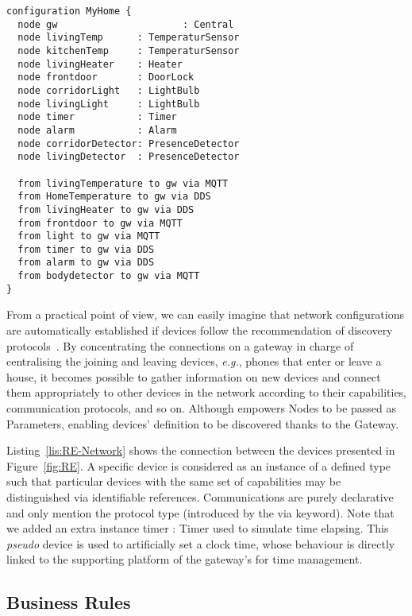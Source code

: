 \begin{lstlisting}[label=lis:RE-Network,language=iotdsl,caption=Network Configuration for Alice's House]	
configuration MyHome {
  node gw 					   : Central
  node livingTemp      : TemperaturSensor
  node kitchenTemp     : TemperaturSensor
  node livingHeater    : Heater
  node frontdoor       : DoorLock
  node corridorLight   : LightBulb
  node livingLight     : LightBulb
  node timer           : Timer
  node alarm           : Alarm
  node corridorDetector: PresenceDetector
  node livingDetector  : PresenceDetector

  from livingTemperature to gw via MQTT
  from HomeTemperature to gw via DDS
  from livingHeater to gw via DDS
  from frontdoor to gw via MQTT
  from light to gw via MQTT
  from timer to gw via DDS
  from alarm to gw via DDS
  from bodydetector to gw via MQTT
}
\end{lstlisting}	

From a practical point of view, we can easily imagine that network configurations are automatically established if devices follow the recommendation of discovery protocols~\cite{}. By concentrating the connections on a gateway in charge of centralising the joining and leaving devices, \textit{e.g.}, phones that enter or leave a house, it becomes possible to gather information on new devices and connect them appropriately to other devices in the network according to their capabilities, communication protocols, and so on. Although \IOTDSL empowers \textsf{Node}s to be passed as \textsf{Parameter}s, enabling devices' definition to be discovered thanks to the \textsf{Gateway}.

Listing~\ref{lis:RE-Network} shows the connection between the devices presented in Figure~\ref{fig:RE}. A specific device is considered as an instance of a defined type such that particular devices with the same set of capabilities may be distinguished via identifiable references. Communications are purely declarative and only mention the protocol type (introduced by the \textsf{via} keyword). Note that we added an extra instance \textsf{timer : Timer} used to simulate time elapsing. This \textit{pseudo} device is used to artificially set a clock time, whose behaviour is directly linked to the supporting platform of the gateway's for time management.
	
\subsection{Business Rules}
\label{sec:IoTDSL-BusinessRules}

